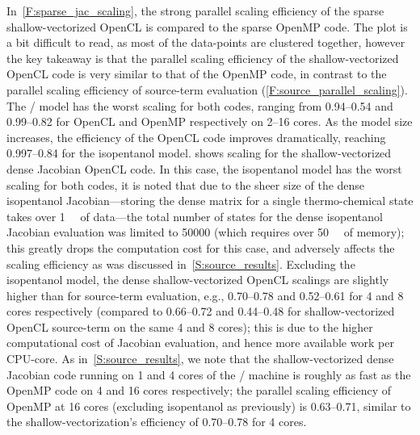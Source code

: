 \documentclass[12pt,number,sort&compress,preprint]{elsarticle}
\begin{document}
In~\cref{F:sparse_jac_scaling}, the strong parallel scaling efficiency of the sparse shallow-vectorized OpenCL is compared to the sparse OpenMP code.
The plot is a bit difficult to read, as most of the data-points are clustered together, however the key takeaway is that the parallel scaling efficiency of the shallow-vectorized OpenCL code is very similar to that of the OpenMP code, in contrast to the parallel scaling efficiency of source-term evaluation (\cref{F:source_parallel_scaling}).
The \slash{} model has the worst scaling for both codes, ranging from \numrange{0.94}{0.54} and \numrange{0.99}{0.82} for OpenCL and OpenMP respectively on \numrange{2}{16} cores.
As the model size increases, the efficiency of the OpenCL code improves dramatically, reaching \numrange{0.997}{0.84} for the isopentanol model.
 shows scaling for the shallow-vectorized dense Jacobian OpenCL code.
In this case, the isopentanol model has the worst scaling for both codes, it is noted that due to the sheer size of the dense isopentanol Jacobian---storing the dense matrix for a single thermo-chemical state takes over \SI{1}{\mega\byte} of data---the total number of states for the dense isopentanol Jacobian evaluation was limited to \num{50000} (which requires over \SI{50}{\giga\byte} of memory); this greatly drops the computation cost for this case, and adversely affects the scaling efficiency as was discussed in~\cref{S:source_results}.
Excluding the isopentanol model, the dense shallow-vectorized OpenCL scalings are slightly higher than for source-term evaluation, e.g., \numrange{0.70}{0.78} and \numrange{0.52}{0.61} for \num{4} and \num{8} cores respectively (compared to \numrange{0.66}{0.72} and \numrange{0.44}{0.48} for shallow-vectorized OpenCL source-term on the same \num{4} and \num{8} cores); this is due to the higher computational cost of Jacobian evaluation, and hence more available work per CPU-core.
As in~\cref{S:source_results}, we note that the shallow-vectorized dense Jacobian code running on \num{1} and \num{4} cores of the \avx/ machine is roughly as fast as the OpenMP code on \num{4} and \num{16} cores respectively; the parallel scaling efficiency of OpenMP at \num{16} cores (excluding isopentanol as previously) is \numrange{0.63}{0.71}, similar to the shallow-vectorization's efficiency of \numrange{0.70}{0.78} for \num{4} cores.
\end{document}
